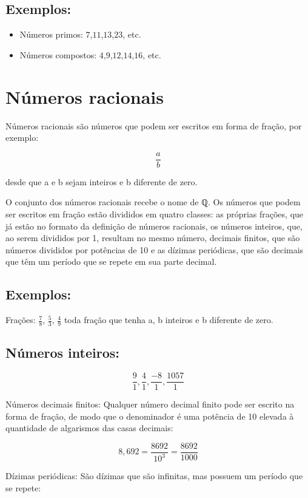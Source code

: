 \subsection{Exemplos:}

\begin{itemize}
\item Números primos: $7$,$11$,$13$,$23$, etc.
\item Números compostos: $4$,$9$,$12$,$14$,$16$, etc.
\end{itemize}

\section{Números racionais}

Números racionais são números que podem ser escritos em forma de fração,
por exemplo:

$$\frac{a}{b}$$

desde que a e b sejam inteiros e b diferente de zero.

O conjunto dos números racionais recebe o nome de ℚ. Os números que
podem ser escritos em fração estão divididos em quatro classes: as
próprias frações, que já estão no formato da definição de números
racionais, os números inteiros, que, ao serem divididos por 1, resultam
no mesmo número, decimais finitos, que são números divididos por
potências de 10 e as dízimas periódicas, que são decimais que têm um
período que se repete em sua parte decimal.

\subsection{Exemplos:}

Frações: $\frac{7}{8}$, $\frac{5}{3}$, $\frac{4}{9}$ toda fração que tenha a,
b inteiros e b diferente de zero.

\subsection{Números inteiros:}

 $$\frac{9}{1},  \frac{4}{1}, \frac{-8}{1},  \frac{1057}{1}$$

Números decimais finitos: Qualquer número decimal finito pode ser
escrito na forma de fração, de modo que o denominador é uma potência de
10 elevada à quantidade de algarismos das casas decimais:

$$8,692  = \frac{8692}{10^{3}} = \frac{8692}{1000}$$

Dízimas periódicas: São dízimas que são infinitas, mas possuem um
período que se repete: 

